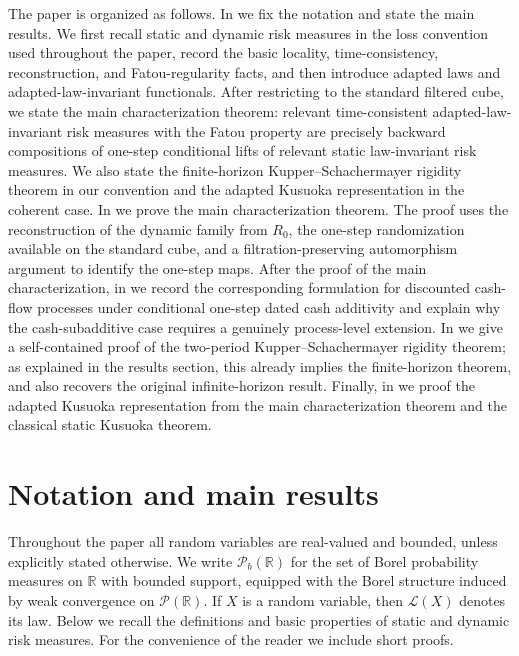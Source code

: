 \documentclass[a4paper]{amsart}
\theoremstyle{definition}
\newcommand{\R}{\mathbb{R}}
\newcommand{\law}{\mathcal{L}}
\newcommand{\Pc}{\mathcal P}
\begin{document}
The paper is organized as follows. In  we fix
the notation and state the main results. We first recall static and dynamic
risk measures in the loss convention used throughout the paper, record the
basic locality, time-consistency, reconstruction, and Fatou-regularity facts,
and then introduce adapted laws and adapted-law-invariant functionals. After
restricting to the standard filtered cube, we state the main characterization
theorem: relevant time-consistent adapted-law-invariant risk measures with the
Fatou property are precisely backward compositions of one-step conditional
lifts of relevant static law-invariant risk measures. We also state the
finite-horizon Kupper--Schachermayer rigidity theorem in our convention and
the adapted Kusuoka representation in the coherent case. In
 we prove the main characterization theorem. The proof uses
the reconstruction of the dynamic family from \(R_0\), the one-step
randomization available on the standard cube, and a filtration-preserving
automorphism argument to identify the one-step maps. After the proof of the main characterization, in
 we record the corresponding formulation for
discounted cash-flow processes under conditional one-step dated cash
additivity and explain why the cash-subadditive case requires a genuinely
process-level extension. In
 we give a self-contained proof of the
two-period Kupper--Schachermayer rigidity theorem; as explained in the results
section, this already implies the finite-horizon theorem, and also recovers
the original infinite-horizon result. Finally, in
 we proof the adapted Kusuoka representation from
the main characterization theorem and the classical static Kusuoka theorem.






\section{Notation and main results}
\label{sec:notation-main-results}

Throughout the paper all random variables are real-valued and bounded, unless
explicitly stated otherwise. We write \(\Pc_b(\R)\) for the set of Borel
probability measures on \(\R\) with bounded support, equipped with the Borel
structure induced by weak convergence on \(\Pc(\R)\). If \(X\) is a random
variable, then \(\law(X)\) denotes its law. Below we recall the definitions and basic properties of static and dynamic risk measures. For the convenience of the reader we include short proofs. 
\end{document}
